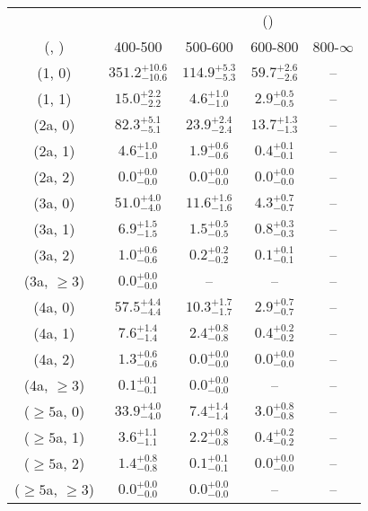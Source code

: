 \begin{table}[h!]
\tiny
\centering
{}
\begin{tabular}
{ccccc}
	\hline\hline
&	& \multicolumn{4}{c}{\scalht (\gev)} \\ 
	 (\njet,  \nb) & 400-500 & 500-600 & 600-800 & 800-$\infty$ \\ [0.8ex] 
\hline
	(1, 0) & $351.2^{+ 10.6 }_{- 10.6 }$ & $114.9^{+ 5.3 }_{- 5.3 }$ & $59.7^{+ 2.6 }_{- 2.6 }$ & -- \\[0.5ex] 
	(1, 1) & $15.0^{+ 2.2 }_{- 2.2 }$ & $4.6^{+ 1.0 }_{- 1.0 }$ & $2.9^{+ 0.5 }_{- 0.5 }$ & -- \\[0.5ex] 
	(2a, 0) & $82.3^{+ 5.1 }_{- 5.1 }$ & $23.9^{+ 2.4 }_{- 2.4 }$ & $13.7^{+ 1.3 }_{- 1.3 }$ & -- \\[0.5ex] 
	(2a, 1) & $4.6^{+ 1.0 }_{- 1.0 }$ & $1.9^{+ 0.6 }_{- 0.6 }$ & $0.4^{+ 0.1 }_{- 0.1 }$ & -- \\[0.5ex] 
	(2a, 2) & $0.0^{+ 0.0 }_{- 0.0 }$ & $0.0^{+ 0.0 }_{- 0.0 }$ & $0.0^{+ 0.0 }_{- 0.0 }$ & -- \\[0.5ex] 
	(3a, 0) & $51.0^{+ 4.0 }_{- 4.0 }$ & $11.6^{+ 1.6 }_{- 1.6 }$ & $4.3^{+ 0.7 }_{- 0.7 }$ & -- \\[0.5ex] 
	(3a, 1) & $6.9^{+ 1.5 }_{- 1.5 }$ & $1.5^{+ 0.5 }_{- 0.5 }$ & $0.8^{+ 0.3 }_{- 0.3 }$ & -- \\[0.5ex] 
	(3a, 2) & $1.0^{+ 0.6 }_{- 0.6 }$ & $0.2^{+ 0.2 }_{- 0.2 }$ & $0.1^{+ 0.1 }_{- 0.1 }$ & -- \\[0.5ex] 
	(3a, $\ge3$) & $0.0^{+ 0.0 }_{- 0.0 }$ & -- & -- & -- \\[0.5ex] 
	(4a, 0) & $57.5^{+ 4.4 }_{- 4.4 }$ & $10.3^{+ 1.7 }_{- 1.7 }$ & $2.9^{+ 0.7 }_{- 0.7 }$ & -- \\[0.5ex] 
	(4a, 1) & $7.6^{+ 1.4 }_{- 1.4 }$ & $2.4^{+ 0.8 }_{- 0.8 }$ & $0.4^{+ 0.2 }_{- 0.2 }$ & -- \\[0.5ex] 
	(4a, 2) & $1.3^{+ 0.6 }_{- 0.6 }$ & $0.0^{+ 0.0 }_{- 0.0 }$ & $0.0^{+ 0.0 }_{- 0.0 }$ & -- \\[0.5ex] 
	(4a, $\ge3$) & $0.1^{+ 0.1 }_{- 0.1 }$ & $0.0^{+ 0.0 }_{- 0.0 }$ & -- & -- \\[0.5ex] 
	($\ge5$a, 0) & $33.9^{+ 4.0 }_{- 4.0 }$ & $7.4^{+ 1.4 }_{- 1.4 }$ & $3.0^{+ 0.8 }_{- 0.8 }$ & -- \\[0.5ex] 
	($\ge5$a, 1) & $3.6^{+ 1.1 }_{- 1.1 }$ & $2.2^{+ 0.8 }_{- 0.8 }$ & $0.4^{+ 0.2 }_{- 0.2 }$ & -- \\[0.5ex] 
	($\ge5$a, 2) & $1.4^{+ 0.8 }_{- 0.8 }$ & $0.1^{+ 0.1 }_{- 0.1 }$ & $0.0^{+ 0.0 }_{- 0.0 }$ & -- \\[0.5ex] 
	($\ge5$a, $\ge3$) & $0.0^{+ 0.0 }_{- 0.0 }$ & $0.0^{+ 0.0 }_{- 0.0 }$ & -- & -- \\[0.5ex] 
	\hline
	\hline
\end{tabular}
\end{table}
